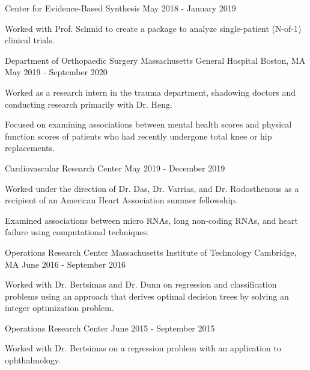 \begin{cventries}
  \cventry
  {Center for Evidence-Based Synthesis} %
  {} %
  {} %
  {May 2018 - January 2019} %
  {
    \begin{cvitems} %
    \item {Worked with Prof. Schmid to create a package to analyze
      single-patient (N-of-1) clinical trials.}
    \end{cvitems}
  }

  \cventry
  {Department of Orthopaedic Surgery} %
  {Massachusetts General Hospital} %
  {Boston, MA} %
  {May 2019 - September 2020} %
  {
    \begin{cvitems} %
    \item {Worked as a research intern in the trauma department, shadowing
      doctors and conducting research primarily with Dr. Heng.}
    \item {Focused on examining associations between mental health scores
        and physical function scores of patients who had recently undergone
      total knee or hip replacements.}
    \end{cvitems}
  }

  \cventry
  {Cardiovascular Research Center} %
  {} %
  {} %
  {May 2019 - December 2019} %
  {
    \begin{cvitems} %
    \item {Worked under the direction of Dr. Das, Dr. Varrias, and Dr.
        Rodosthenous as a recipient of an American Heart Association summer
      fellowship.}
    \item {Examined associations between micro RNAs, long non-coding RNAs, and
      heart failure using computational techniques.}
    \end{cvitems}
  }

  \cventry
  {Operations Research Center} %
  {Massachusetts Institute of Technology} %
  {Cambridge, MA} %
  {June 2016 - September 2016} %
  {
    \begin{cvitems} %
    \item {Worked with Dr. Bertsimas and Dr. Dunn on regression and
        classification problems using an approach that derives optimal decision
      trees by solving an integer optimization problem.}
    \end{cvitems}
  }

  \cventry
  {Operations Research Center} %
  {} %
  {} %
  {June 2015 - September 2015} %
  {
    \begin{cvitems} %
    \item {Worked with Dr. Bertsimas on a regression problem with an
      application to ophthalmology.}
    \end{cvitems}
  }

\end{cventries}
